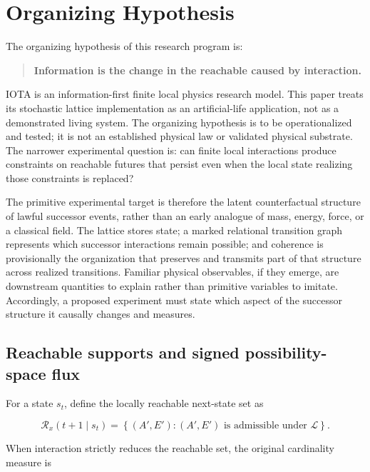 \section{Organizing Hypothesis}
\label{sec:hypothesis}

The organizing hypothesis of this research program is:

\begin{quote}
\textbf{Information is the change in the reachable caused by interaction.}
\end{quote}

IOTA is an information-first finite local physics research model. This paper
treats its stochastic lattice implementation as an artificial-life application,
not as a demonstrated living system. The organizing hypothesis is to be
operationalized and tested; it is not an established physical law or validated
physical substrate. The narrower experimental question is: can finite local
interactions produce constraints on reachable futures that persist even when
the local state realizing those constraints is replaced?

The primitive experimental target is therefore the latent counterfactual
structure of lawful successor events, rather than an early analogue of mass,
energy, force, or a classical field. The lattice stores state; a marked
relational transition graph represents which successor interactions remain
possible; and coherence is provisionally the organization that preserves and
transmits part of that structure across realized transitions. Familiar physical
observables, if they emerge, are downstream quantities to explain rather than
primitive variables to imitate. Accordingly, a proposed experiment must state
which aspect of the successor structure it causally changes and measures.

\subsection{Reachable supports and signed possibility-space flux}

For a state $s_t$, define the locally reachable next-state set as

\begin{equation}
\mathcal{R}_x(t+1\mid s_t)
=
\left\{(A',E'):(A',E')\text{ is admissible under }\mathcal{L}\right\}.
\label{eq:reachable}
\end{equation}

When interaction strictly reduces the reachable set, the original cardinality
measure is

